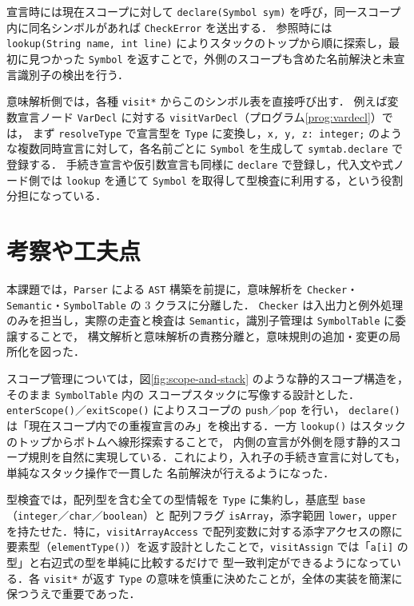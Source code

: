 \documentclass[a4j,10pt]{jarticle}
\begin{document}
宣言時には現在スコープに対して \verb|declare(Symbol sym)| を呼び，同一スコープ内に同名シンボルがあれば \verb|CheckError| を送出する．
参照時には \verb|lookup(String name, int line)| によりスタックのトップから順に探索し，最初に見つかった \verb|Symbol| を返すことで，外側のスコープも含めた名前解決と未宣言識別子の検出を行う．

意味解析側では，各種 \verb|visit*| からこのシンボル表を直接呼び出す．
例えば変数宣言ノード \verb|VarDecl| に対する \verb|visitVarDecl|（プログラム\ref{prog:vardecl}）では，
まず \verb|resolveType| で宣言型を \verb|Type| に変換し，\verb|x, y, z: integer;| のような複数同時宣言に対して，各名前ごとに \verb|Symbol| を生成して \verb|symtab.declare| で登録する．
手続き宣言や仮引数宣言も同様に \verb|declare| で登録し，代入文や式ノード側では \verb|lookup| を通じて \verb|Symbol| を取得して型検査に利用する，という役割分担になっている．


\section{考察や工夫点}

本課題では，\verb|Parser| による \verb|AST| 構築を前提に，意味解析を \verb|Checker|・\verb|Semantic|・\verb|SymbolTable| の 3 クラスに分離した．
\verb|Checker| は入出力と例外処理のみを担当し，実際の走査と検査は \verb|Semantic|，識別子管理は \verb|SymbolTable| に委譲することで，
構文解析と意味解析の責務分離と，意味規則の追加・変更の局所化を図った．

スコープ管理については，図\ref{fig:scope-and-stack} のような静的スコープ構造を，そのまま \verb|SymbolTable| 内の
スコープスタックに写像する設計とした．\verb|enterScope()|／\verb|exitScope()| によりスコープの \verb|push|／\verb|pop| を行い，
\verb|declare()| は「現在スコープ内での重複宣言のみ」を検出する．一方 \verb|lookup()| はスタックのトップからボトムへ線形探索することで，
内側の宣言が外側を隠す静的スコープ規則を自然に実現している．これにより，入れ子の手続き宣言に対しても，単純なスタック操作で一貫した
名前解決が行えるようになった．

型検査では，配列型を含む全ての型情報を \verb|Type| に集約し，基底型 \verb|base|（\verb|integer|／\verb|char|／\verb|boolean|）と
配列フラグ \verb|isArray|，添字範囲 \verb|lower|，\verb|upper| を持たせた．特に，\verb|visitArrayAccess| で配列変数に対する添字アクセスの際に
要素型（\verb|elementType()|）を返す設計としたことで，\verb|visitAssign| では「\verb|a[i]| の型」と右辺式の型を単純に比較するだけで
型一致判定ができるようになっている．各 \verb|visit*| が返す \verb|Type| の意味を慎重に決めたことが，全体の実装を簡潔に保つうえで重要であった．
\end{document}
